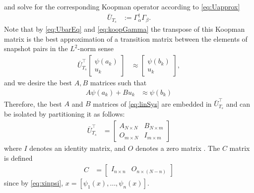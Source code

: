and solve for the corresponding Koopman operator according to \eqref{eq:Uapprox}
\begin{align}
    \bar{U}_{T_s} &:= \Gamma_{\alpha}^\dagger \Gamma_\beta.
    \label{eq:koopGamma}
\end{align}
Note that by \eqref{eq:UbarEq} and \eqref{eq:koopGamma} the transpose of this Koopman matrix is the best approximation of a transition matrix between the elements of snapshot pairs in the $L^2$-norm sense 
\begin{align}
    \bar{U}_{T_s}^\top 
    \begin{bmatrix} \psi(a_k) \\ u_k \end{bmatrix} &\approx
    \begin{bmatrix} \psi(b_k) \\ u_k \end{bmatrix},
\end{align}
and we desire the best $A,B$ matrices such that
\begin{align}
    A \psi(a_k) + B u_k &\approx \psi(b_k)
    \label{eq:linSys_psi}
\end{align}
Therefore, the best $A$ and $B$ matrices of \eqref{eq:linSys} are embedded in $\bar{U}_{T_s}^\top$ and can be isolated by partitioning it as follows:
\begin{align}
    \bar{U}_{T_s}^\top &= 
    \begin{bmatrix} 
        A_{N \times N} &
        B_{N \times m} \\
        O_{m \times N} &
        I_{m \times m}
    \end{bmatrix}
    \label{eq:AB}
\end{align}
where $I$ denotes an identity matrix, and $O$ denotes a zero matrix .
The $C$ matrix is defined
\begin{align}
    C &= \begin{bmatrix} I_{n \times n} & O_{n \times (N-n)} \end{bmatrix}
\end{align}
since by \eqref{eq:xinpsi}, ${x = [ \psi_1(x) , \dots , \psi_n(x) ]}$.




